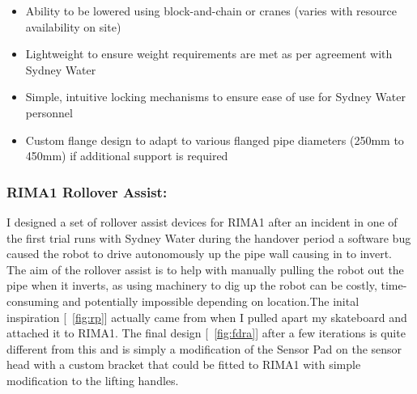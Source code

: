 \begin{itemize}
    \item Ability to be lowered using block-and-chain or cranes (varies with resource availability on site)
    \item Lightweight to ensure weight requirements are met as per agreement with Sydney Water
    \item Simple, intuitive locking mechanisms to ensure ease of use for Sydney Water personnel
    \item Custom flange design to adapt to various flanged pipe diameters (250mm to 450mm) if additional support is required
\end{itemize}


\newpage
\subsubsection{RIMA1 Rollover Assist:}
I designed a set of rollover assist devices for RIMA1 after an incident in one of the first trial runs with Sydney Water during the handover period
a software bug caused the robot to drive autonomously up the pipe wall causing in to invert. The aim of the rollover assist is to help with manually pulling the robot out the pipe when it inverts, as 
using machinery to dig up the robot can be costly, time-consuming and potentially impossible depending on location.The inital inspiration [~\ref{fig:rp}] actually came from when I pulled apart my skateboard and attached it to RIMA1.
The final design [~\ref{fig:fdra}] after a few iterations is quite different from this and is simply a modification of the Sensor Pad on the sensor head with a custom bracket that could be fitted to RIMA1 with simple modification to the lifting handles.  

